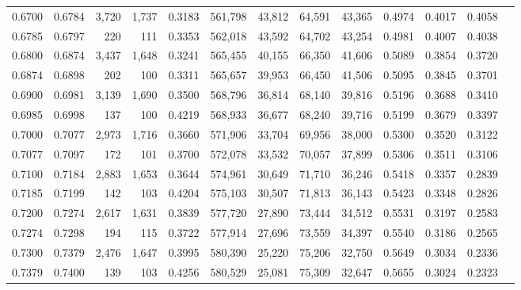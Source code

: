 \begin{tabular}{rrrrrrrrrrrrr}
0.6700 & 0.6784 &  3,720 & 1,737 &                                     0.3183 & 561,798 &  43,812 &  64,591 &  43,365 & 0.4974 & 0.4017 & 0.4058 \\
0.6785 & 0.6797 &    220 &   111 &                                     0.3353 & 562,018 &  43,592 &  64,702 &  43,254 & 0.4981 & 0.4007 & 0.4038 \\
0.6800 & 0.6874 &  3,437 & 1,648 &                                     0.3241 & 565,455 &  40,155 &  66,350 &  41,606 & 0.5089 & 0.3854 & 0.3720 \\
0.6874 & 0.6898 &    202 &   100 &                                     0.3311 & 565,657 &  39,953 &  66,450 &  41,506 & 0.5095 & 0.3845 & 0.3701 \\
0.6900 & 0.6981 &  3,139 & 1,690 &                                     0.3500 & 568,796 &  36,814 &  68,140 &  39,816 & 0.5196 & 0.3688 & 0.3410 \\
0.6985 & 0.6998 &    137 &   100 &                                     0.4219 & 568,933 &  36,677 &  68,240 &  39,716 & 0.5199 & 0.3679 & 0.3397 \\
0.7000 & 0.7077 &  2,973 & 1,716 &                                     0.3660 & 571,906 &  33,704 &  69,956 &  38,000 & 0.5300 & 0.3520 & 0.3122 \\
0.7077 & 0.7097 &    172 &   101 &                                     0.3700 & 572,078 &  33,532 &  70,057 &  37,899 & 0.5306 & 0.3511 & 0.3106 \\
0.7100 & 0.7184 &  2,883 & 1,653 &                                     0.3644 & 574,961 &  30,649 &  71,710 &  36,246 & 0.5418 & 0.3357 & 0.2839 \\
0.7185 & 0.7199 &    142 &   103 &                                     0.4204 & 575,103 &  30,507 &  71,813 &  36,143 & 0.5423 & 0.3348 & 0.2826 \\
0.7200 & 0.7274 &  2,617 & 1,631 &                                     0.3839 & 577,720 &  27,890 &  73,444 &  34,512 & 0.5531 & 0.3197 & 0.2583 \\
0.7274 & 0.7298 &    194 &   115 &                                     0.3722 & 577,914 &  27,696 &  73,559 &  34,397 & 0.5540 & 0.3186 & 0.2565 \\
0.7300 & 0.7379 &  2,476 & 1,647 &                                     0.3995 & 580,390 &  25,220 &  75,206 &  32,750 & 0.5649 & 0.3034 & 0.2336 \\
0.7379 & 0.7400 &    139 &   103 &                                     0.4256 & 580,529 &  25,081 &  75,309 &  32,647 & 0.5655 & 0.3024 & 0.2323 \\

\end{tabular}
